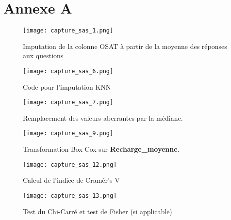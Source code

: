 \chapter*{Annexe A}
\adjustmtc
\thispagestyle{MyStyle}

\makeatletter\renewcommand{}\makeatother

\appendix

\begin{figure}[H]
    \centering
    \texttt{[image: capture\_sas\_1.png]}
    \caption{Imputation de la colonne OSAT à partir de la moyenne des réponses aux questions}
    \label{imputation_code}
\end{figure}

\begin{figure}[H]
    \centering
    \texttt{[image: capture\_sas\_6.png]}
    \caption{Code pour l'imputation KNN}
    \label{fig:knn_code}
\end{figure}

\begin{figure}[H] 
    \centering 
    \texttt{[image: capture\_sas\_7.png]} 
    \caption{Remplacement des valeurs aberrantes par la médiane.}
    \label{fig:aberrant_values}
\end{figure}

\begin{figure}[H] 
    \centering 
    \texttt{[image: capture\_sas\_9.png]} 
    \caption{Transformation Box-Cox sur \textbf{Recharge\_moyenne}.}
    \label{fig:boxcox_transformation}
\end{figure}


\begin{figure}[H]
    \centering
    \texttt{[image: capture\_sas\_12.png]}
    \caption{Calcul de l'indice de Cramér’s V}
    \label{00}
\end{figure}
\vspace{10pt}

\begin{figure}[H]
    \centering
    \texttt{[image: capture\_sas\_13.png]}
    \caption{Test du Chi-Carré et test de Fisher (si applicable)}
    \label{222}
\end{figure}
\vspace{10pt}

